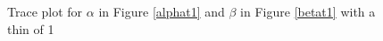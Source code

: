\documentclass[12pt, leqno]{article}
\begin{document}
\begin{figure}
\centering
{}
\centering
\qquad
\centering
{}
\caption{Trace plot for $\alpha$ in Figure \ref{alphat1}  and $\beta$ in Figure \ref{betat1}  with a thin of 1}
\end{figure}
\end{document}
